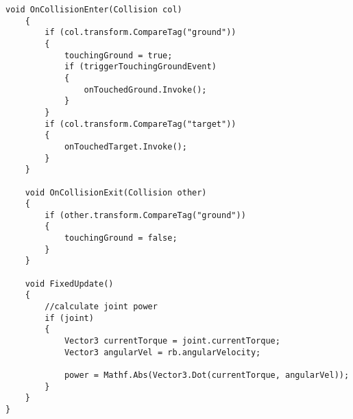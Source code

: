 \begin{lstlisting}[caption={Körperteil Skript},captionpos=b,label={lst:skript_körperteil}]
    void OnCollisionEnter(Collision col)
    {
        if (col.transform.CompareTag("ground"))
        {
            touchingGround = true;
            if (triggerTouchingGroundEvent)
            {
                onTouchedGround.Invoke();
            }
        }
        if (col.transform.CompareTag("target"))
        {
            onTouchedTarget.Invoke();
        }
    }

    void OnCollisionExit(Collision other)
    {
        if (other.transform.CompareTag("ground"))
        {
            touchingGround = false;
        }
    }

    void FixedUpdate()
    {
        //calculate joint power
        if (joint)
        {
            Vector3 currentTorque = joint.currentTorque;
            Vector3 angularVel = rb.angularVelocity;

            power = Mathf.Abs(Vector3.Dot(currentTorque, angularVel));
        }
    }
}
\end{lstlisting}

